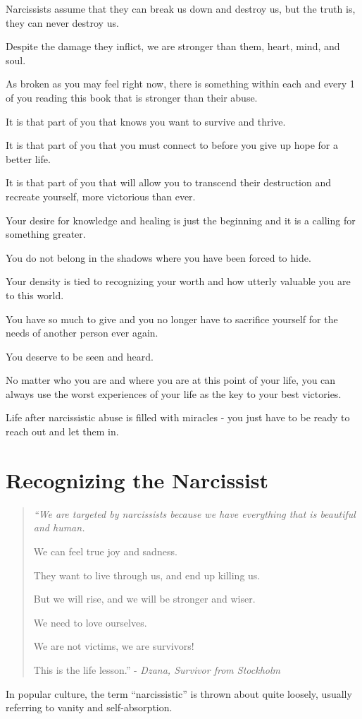 \documentclass[oneside]{book}
\numberwithin{equation}{section}
\begin{document}
%
Narcissists assume that they can break us down and destroy us, but the truth is, they can never destroy us.

Despite the damage they inflict, we are stronger than them, heart, mind, and soul.

As broken as you may feel right now, there is something within each and every 1 of you reading this book that is stronger than their abuse.

It is that part of you that knows you want to survive and thrive.

It is that part of you that you must connect to before you give up hope for a better life.

It is that part of you that will allow you to transcend their destruction and recreate yourself, more victorious than ever.

%
Your desire for knowledge and healing is just the beginning and it is a calling for something greater.

You do not belong in the shadows where you have been forced to hide.


Your density is tied to recognizing your worth and how utterly valuable you are to this world.

You have so much to give and you no longer have to sacrifice yourself for the needs of another person ever again.


You deserve to be seen and heard.

%
No matter who you are and where you are at this point of your life, you can always use the worst experiences of your life as the key to your best victories.

Life after narcissistic abuse is filled with miracles - you just have to be ready to reach out and let them in.

\section{Recognizing the Narcissist}
\begin{quotation}\it
    ``We are targeted by narcissists because we have everything that is beautiful and human.
    
    We can feel true joy and sadness.
    
    They want to live through us, and end up killing us.
    
    But we will rise, and we will be stronger and wiser.
    
    We need to love ourselves.
    
    We are not victims, we are survivors!
    
    This is the life lesson.'' - \emph{Dzana, Survivor from Stockholm}
\end{quotation}
In popular culture, the term ``narcissistic'' is thrown about quite loosely, usually referring to vanity and self-absorption.
\end{document}
